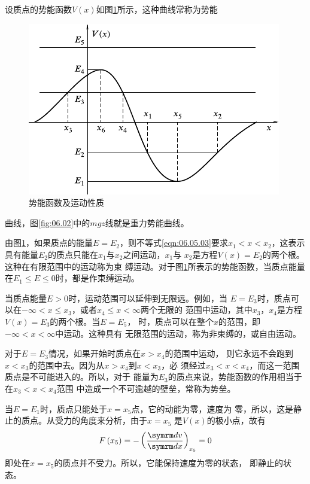 设质点的势能函数$ V \left( x \right) $如图\ref{fig:06.12}所示，这种曲线常称为势能
\begin{figure}[h]
  \centering
  \includegraphics{figure/fig06.12}
  \caption{势能函数及运动性质}
  \label{fig:06.12}
  \vspace{-0.8em}
\end{figure}
\clearpage\noindent
曲线，图\ref{fig:06.02}中的$ mgz $线就是重力势能曲线。


由图\ref{fig:06.12}，如果质点的能量$ E=E_2 $，则不等式\eqref{eqn:06.05.03}要求$x _ 1
  < x < x _ 2$，这表示具有能量$ E_2 $的质点只能在$ x_1 $与$ x_2 $之间运动，$ x_1 $与
$ x_2 $是方程$ V \left(x\right) = E_2 $的两个根。这种在有限范围中的运动称为束
缚运动。对于图\ref{fig:06.12}所表示的势能函数，当质点能量在$ E_1 \leqslant E \leqslant 0 $时，都是作束缚运动。

当质点能量$ E > 0 $时，运动范围可以延伸到无限远。例如，当
$ E = E _ 3 $时，质点可以在$ -\infty < x \leqslant x_3 $，或者$ x_4 \leqslant x < \infty $两个无限的
范围中运动，其中$ x_3 $，$ x_4 $是方程$ V \left( x \right) = E _ { 3 } $的两个根。当$ E = E _ 5 $，
时，质点可以在整个$ x $的范围，即$ - \infty < x < \infty $中运动。这种具有
无限范围的运动，称为非束缚的，或自由运动。

对于$ E = E _ 3 $情况，如果开始时质点在$ x > x _ { 4 } $的范围中运动，
则它永远不会跑到$ x < x_3 $的范围中去。因为从$ x > x _ { 4 } $到$ x < x _ 3 $，必
须经过$ x_3 < x < x_4 $，而这一范围质点是不可能进入的。所以，对于
能量为$ E_3 $的质点来说，势能函数的作用相当于在$ x _ { 3 } < x < x _ { 4 } $范围
中造成一个不可逾越的壁垒，常称为势垒。

当$ E = E _ 1 $时，质点只能处于$ x = x_5 $点，它的动能为零，速度为
零，所以，这是静止的质点。从受力的角度来分析，由于$ x = x_5 $
是$ V\left(x\right) $的极小点，故有
\begin{equation*}
  F \left( x _ { 5 } \right) = - \left( \frac { \dif v } { \dif x } \right) _ { x _ 5 } = 0
\end{equation*}
即处在$ x = x_5 $的质点并不受力。所以，它能保持速度为零的状态，
即静止的状态。

